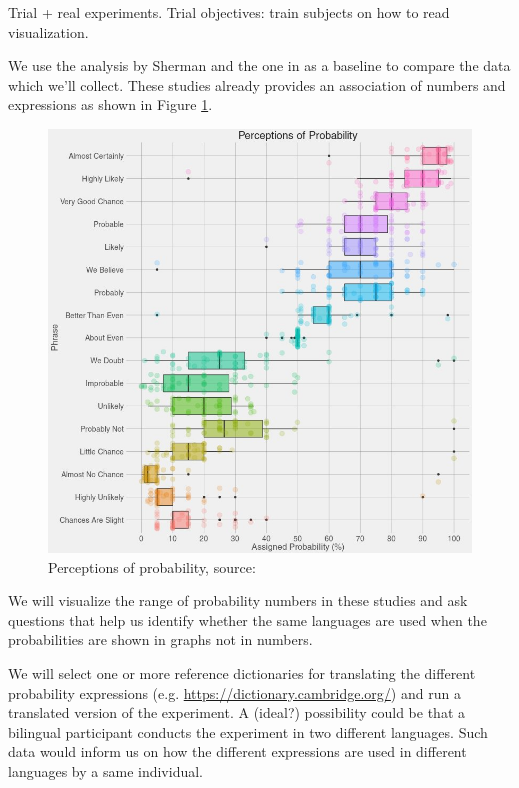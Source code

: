 \documentclass{proc}
\begin{document}
Trial + real experiments. Trial objectives: train subjects on how to read visualization.

We use the analysis by Sherman \cite{desjardins2017measuring} and the one in \cite{zonination} as a baseline to compare the data which we'll collect. These studies already provides an association of numbers and expressions as shown in Figure \ref{perceptions-of-probability}.

\begin{figure}[!t]
    \centering
    \includegraphics[width=\columnwidth]{figures/perceptions-of-probability.jpg}
    \caption{Perceptions of probability, source: \cite{zonination}}
    \label{perceptions-of-probability}
\end{figure}

We will visualize the range of probability numbers in these studies and ask questions that help us identify whether the same languages are used when the probabilities are shown in graphs not in numbers. 

We will select one or more reference dictionaries for translating the different probability expressions (e.g. \url{https://dictionary.cambridge.org/}) and run a translated version of the experiment. A (ideal?) possibility could be that a bilingual participant conducts the experiment in two different languages. Such data would inform us on how the different expressions are used in different languages by a same individual. 
\end{document}
